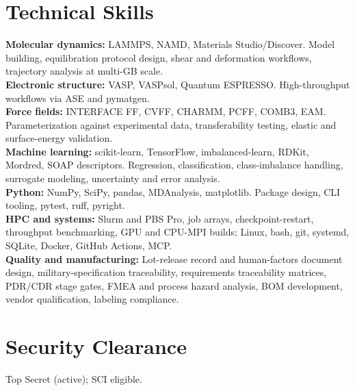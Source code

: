 \documentclass[letterpaper,10pt]{article}
\newcommand{\keepsection}{\needspace{6\baselineskip}}
\begin{document}
\keepsection\section*{Technical Skills}
\textbf{Molecular dynamics:} LAMMPS, NAMD, Materials Studio/Discover. Model building, equilibration protocol design, shear and deformation workflows, trajectory analysis at multi-GB scale.\\
\textbf{Electronic structure:} VASP, VASPsol, Quantum ESPRESSO. High-throughput workflows via ASE and pymatgen.\\
\textbf{Force fields:} INTERFACE FF, CVFF, CHARMM, PCFF, COMB3, EAM. Parameterization against experimental data, transferability testing, elastic and surface-energy validation.\\
\textbf{Machine learning:} scikit-learn, TensorFlow, imbalanced-learn, RDKit, Mordred, SOAP descriptors. Regression, classification, class-imbalance handling, surrogate modeling, uncertainty and error analysis.\\
\textbf{Python:} NumPy, SciPy, pandas, MDAnalysis, matplotlib. Package design, CLI tooling, pytest, ruff, pyright.\\
\textbf{HPC and systems:} Slurm and PBS Pro, job arrays, checkpoint-restart, throughput benchmarking, GPU and CPU-MPI builds; Linux, bash, git, systemd, SQLite, Docker, GitHub Actions, MCP.\\
\textbf{Quality and manufacturing:} Lot-release record and human-factors document design, military-specification traceability, requirements traceability matrices, PDR/CDR stage gates, FMEA and process hazard analysis, BOM development, vendor qualification, labeling compliance.

\keepsection\section*{Security Clearance}
Top Secret (active); SCI eligible.
\end{document}
